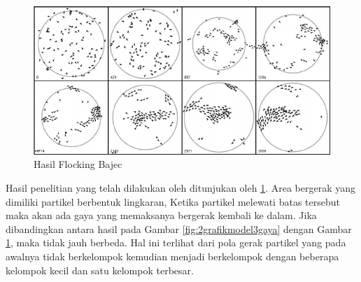 \begin{figure}
\centering
\includegraphics[scale=0.4]{gambar/Bajec.PNG}
\caption{Hasil Flocking Bajec}
\label{fig:bajec1}
\end{figure}
\hspace{0.6cm}Hasil penelitian yang telah dilakukan oleh \citep{Bajec2007} ditunjukan oleh \ref{fig:bajec1}. Area bergerak yang dimiliki partikel berbentuk lingkaran, Ketika partikel melewati batas tersebut maka akan ada gaya yang memaksanya bergerak kembali ke dalam. Jika dibandingkan antara hasil pada Gambar \ref{fig:2grafikmodel3gaya}  dengan Gambar \ref{fig:bajec1}, maka tidak jauh berbeda. Hal ini terlihat dari pola gerak partikel yang pada awalnya tidak berkelompok kemudian menjadi berkelompok dengan beberapa kelompok kecil dan satu kelompok terbesar. 


%
%